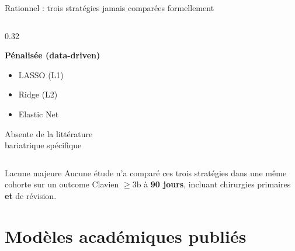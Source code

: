 \documentclass[aspectratio=169]{beamer}
\newcommand{\tightlist}{%
  \setlength{\itemsep}{1pt}\setlength{\parskip}{0pt}%
  \setlength{\parsep}{0pt}\setlength{\topsep}{2pt}}
\begin{document}
\begin{frame}[shrink=5]{Rationnel : trois stratégies jamais comparées formellement}
\begin{columns}[T]
\begin{column}{0.32\textwidth}
\begin{tcolorbox}[colback=bleupale,colframe=vertdoux,
        title={\small\textbf{Approche 3}},fonttitle=\bfseries\small,top=3pt,bottom=3pt]
        \footnotesize\textbf{Pénalisée (data-driven)}\\[3pt]
        \begin{itemize}\tightlist
          \item LASSO (L1)
          \item Ridge (L2)
          \item Elastic Net
        \end{itemize}
        \vspace{3pt}
        \textcolor{orangemod}{\footnotesize Absente de la littérature\\bariatrique spécifique}
      \end{tcolorbox}
    \end{column}
  \end{columns}
  \vspace{0.3em}
  \begin{alertblock}{\small Lacune majeure}
    \small Aucune étude n'a comparé ces trois stratégies dans une même cohorte sur un outcome Clavien $\geq$3b à \textbf{90 jours}, incluant chirurgies primaires \textbf{et} de révision.
  \end{alertblock}
\end{frame}

\section{Modèles académiques publiés}
\end{document}
